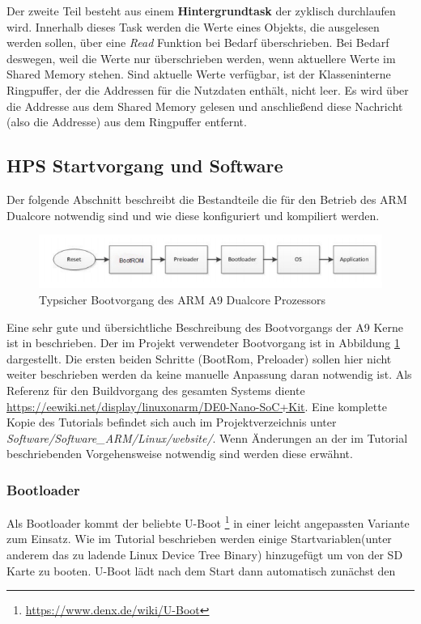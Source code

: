 Der zweite Teil besteht aus einem \textbf{Hintergrundtask} der zyklisch durchlaufen wird. Innerhalb dieses Task werden die Werte eines Objekts, die ausgelesen werden sollen, über eine \textit{Read} Funktion bei Bedarf überschrieben. Bei Bedarf deswegen, weil die Werte nur überschrieben werden, wenn aktuellere Werte im Shared Memory stehen. Sind aktuelle Werte verfügbar, ist der Klasseninterne Ringpuffer, der die Addressen für die Nutzdaten enthält, nicht leer. Es wird über die Addresse aus dem Shared Memory gelesen und anschließend diese Nachricht (also die Addresse) aus dem Ringpuffer entfernt.

\subsection{HPS Startvorgang und Software}
Der folgende Abschnitt beschreibt die Bestandteile die für den Betrieb des ARM Dualcore notwendig sind und wie diese konfiguriert und kompiliert werden.\\

\begin{figure}
	\includegraphics[width=\textwidth]{Abb/Booting.png}
	\caption{Typsicher Bootvorgang des ARM A9 Dualcore Prozessors \cite{arm_booting}}
	\label{Software:ArmBooting}
\end{figure}

Eine sehr gute und übersichtliche Beschreibung des Bootvorgangs der A9 Kerne ist in \cite{arm_booting} beschrieben. Der im \Projectname Projekt verwendeter Bootvorgang ist in Abbildung \ref{Software:ArmBooting} dargestellt. Die ersten beiden Schritte (BootRom, Preloader) sollen hier nicht weiter beschrieben werden da keine manuelle Anpassung daran notwendig ist. Als Referenz für den Buildvorgang des gesamten Systems diente \href{https://eewiki.net/display/linuxonarm/DE0-Nano-SoC+Kit}{https://eewiki.net/display/linuxonarm/DE0-Nano-SoC+Kit}. Eine komplette Kopie des Tutorials befindet sich auch im Projektverzeichnis unter \textit{Software/Software\_ARM/Linux/website/}. Wenn Änderungen an der im Tutorial beschriebenden Vorgehensweise notwendig sind werden diese erwähnt.

\subsubsection{Bootloader}
Als Bootloader kommt der beliebte U-Boot \footnote{\href{https://www.denx.de/wiki/U-Boot}{https://www.denx.de/wiki/U-Boot}} in einer leicht angepassten Variante zum Einsatz. Wie im Tutorial beschrieben werden einige Startvariablen(unter anderem das zu ladende Linux Device Tree Binary) hinzugefügt um von der SD Karte zu booten. U-Boot lädt nach dem Start dann automatisch zunächst den

